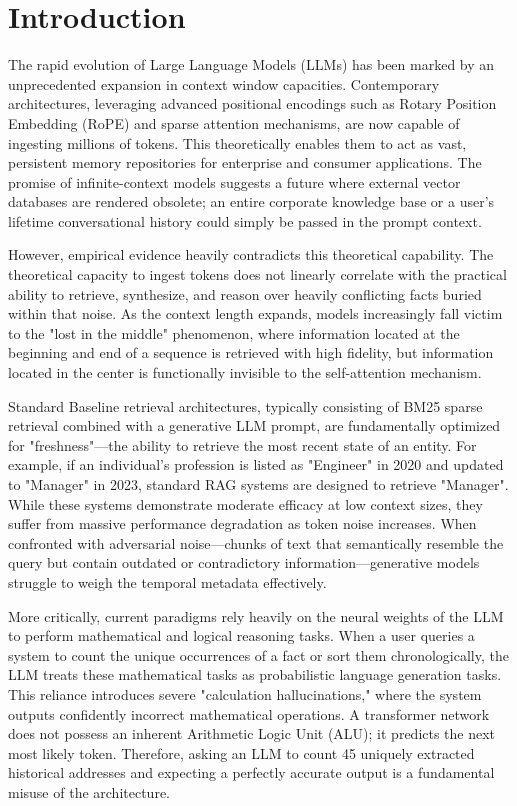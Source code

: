 \documentclass[journal,10pt]{IEEEtran}
\begin{document}
\section{Introduction}
The rapid evolution of Large Language Models (LLMs) has been marked by an unprecedented expansion in context window capacities. Contemporary architectures, leveraging advanced positional encodings such as Rotary Position Embedding (RoPE) and sparse attention mechanisms, are now capable of ingesting millions of tokens. This theoretically enables them to act as vast, persistent memory repositories for enterprise and consumer applications. The promise of infinite-context models suggests a future where external vector databases are rendered obsolete; an entire corporate knowledge base or a user's lifetime conversational history could simply be passed in the prompt context.

However, empirical evidence heavily contradicts this theoretical capability. The theoretical capacity to ingest tokens does not linearly correlate with the practical ability to retrieve, synthesize, and reason over heavily conflicting facts buried within that noise. As the context length expands, models increasingly fall victim to the "lost in the middle" phenomenon, where information located at the beginning and end of a sequence is retrieved with high fidelity, but information located in the center is functionally invisible to the self-attention mechanism. 

Standard Baseline retrieval architectures, typically consisting of BM25 sparse retrieval combined with a generative LLM prompt, are fundamentally optimized for "freshness"—the ability to retrieve the most recent state of an entity. For example, if an individual's profession is listed as "Engineer" in 2020 and updated to "Manager" in 2023, standard RAG systems are designed to retrieve "Manager". While these systems demonstrate moderate efficacy at low context sizes, they suffer from massive performance degradation as token noise increases. When confronted with adversarial noise—chunks of text that semantically resemble the query but contain outdated or contradictory information—generative models struggle to weigh the temporal metadata effectively.

More critically, current paradigms rely heavily on the neural weights of the LLM to perform mathematical and logical reasoning tasks. When a user queries a system to count the unique occurrences of a fact or sort them chronologically, the LLM treats these mathematical tasks as probabilistic language generation tasks. This reliance introduces severe "calculation hallucinations," where the system outputs confidently incorrect mathematical operations. A transformer network does not possess an inherent Arithmetic Logic Unit (ALU); it predicts the next most likely token. Therefore, asking an LLM to count 45 uniquely extracted historical addresses and expecting a perfectly accurate output is a fundamental misuse of the architecture.
\end{document}
